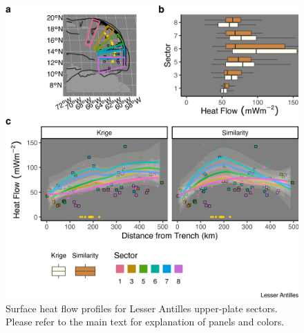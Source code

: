 \begin{figure}[htbp]

{\centering \includegraphics[width=1\linewidth,]{assets/figs/chpt3/LesserAntillesUpperPlate} 

}

\caption[Surface heat flow profiles for Lesser Antilles upper-plate sectors]{Surface heat flow profiles for Lesser Antilles upper-plate sectors. Please refer to the main text for explanation of panels and colors.}\label{fig:lesserAntillesUpper}
\end{figure}

